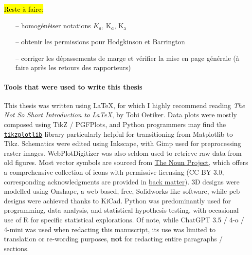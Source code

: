 \vfill

\hl{Reste à faire:}
\begin{enumerate}
	\item[--] homogénéiser notations $K_a$, K$_a$, K$_\text{a}$
	\item[--] obtenir les permissions pour Hodgkinson et Barrington
	\item[--] corriger les dépassements de marge et vérifier la mise en page générale (à faire après les retours des rapporteurs)
\end{enumerate}

\vfill
\setcounter{secnumdepth}{3}

\paragraph{Tools that were used to write this thesis} \hphantom{text}

This thesis was written using \LaTeX{}, for which I highly recommend reading \emph{The Not So Short Introduction to \LaTeX}, by Tobi Oetiker\cite{oetiker2007}. Data plots were mostly composed using TikZ / PGFPlots, and Python programmers may find the \href{https://web.archive.org/web/20240506065201/https://pypi.org/project/tikzplotlib/}{\texttt{tikzplotlib}} library particularly helpful for transitioning from Matplotlib to Tikz. Schematics were edited using Inkscape, with Gimp used for preprocessing raster images. WebPlotDigitizer was also seldom used to retrieve raw data from old figures. Most vector symbols are sourced from \href{https://web.archive.org/web/20240505215016/https://thenounproject.com/}{The Noun Project}, which offers a comprehensive collection of icons with permissive licensing (CC BY 3.0, corresponding acknowledgments are provided in \hyperref[chap:add_ack]{back matter}). 3D designs were modelled using Onshape, a web-based, free, Solidworks-like software, while \gls{pcb} designs were achieved thanks to KiCad. Python was predominantly used for programming, data analysis, and statistical hypothesis testing, with occasional use of R for specific statistical explorations. Of note, while ChatGPT 3.5 / 4-o / 4-mini was used when redacting this manuscript, its use was limited to translation or re-wording purposes, \textbf{not} for redacting entire paragraphs / sections.

\setcounter{secnumdepth}{4}